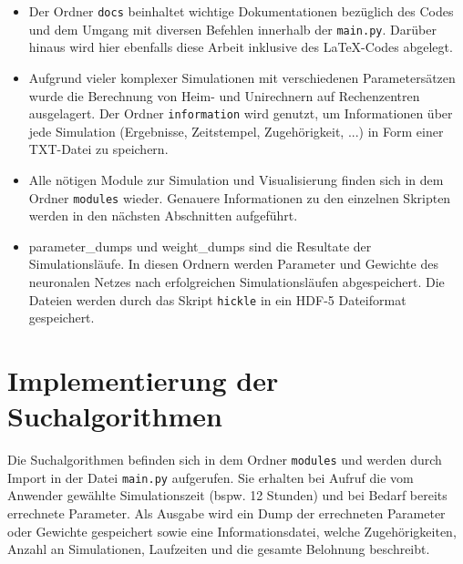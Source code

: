 	\begin{minipage}{0.65\textwidth}
		\begin{itemize}
			\item Der Ordner \texttt{docs} beinhaltet wichtige Dokumentationen bezüglich des Codes und dem Umgang mit diversen Befehlen innerhalb der \texttt{main.py}. Darüber hinaus wird hier ebenfalls diese Arbeit inklusive des \LaTeX-Codes abgelegt.
			\item Aufgrund vieler komplexer Simulationen mit verschiedenen Parametersätzen wurde die Berechnung von Heim- und Unirechnern auf Rechenzentren ausgelagert. Der Ordner \texttt{information} wird genutzt, um Informationen über jede Simulation (Ergebnisse, Zeitstempel, Zugehörigkeit, ...) in Form einer TXT-Datei zu speichern.
			\item Alle nötigen Module zur Simulation und Visualisierung finden sich in dem Ordner \texttt{modules} wieder. Genauere Informationen zu den einzelnen Skripten werden in den nächsten Abschnitten aufgeführt.
			\item parameter\_dumps und weight\_dumps sind die Resultate der Simulationsläufe. In diesen Ordnern werden Parameter und Gewichte des neuronalen Netzes nach erfolgreichen Simulationsläufen abgespeichert. Die Dateien werden durch das Skript \texttt{hickle} in ein HDF-5 Dateiformat \cite{hdf5} gespeichert.
		\end{itemize}		
	\end{minipage}
	
	
		
\section{Implementierung der Suchalgorithmen}
\label{sec:imp_search}
	Die Suchalgorithmen befinden sich in dem Ordner \texttt{modules} und werden durch Import in der Datei \texttt{main.py} aufgerufen. Sie erhalten bei Aufruf die vom Anwender gewählte Simulationszeit (bspw. 12 Stunden) und bei Bedarf bereits errechnete Parameter. Als Ausgabe wird ein Dump der errechneten Parameter oder Gewichte gespeichert sowie eine Informationsdatei, welche Zugehörigkeiten, Anzahl an Simulationen, Laufzeiten und die gesamte Belohnung beschreibt. 
	
